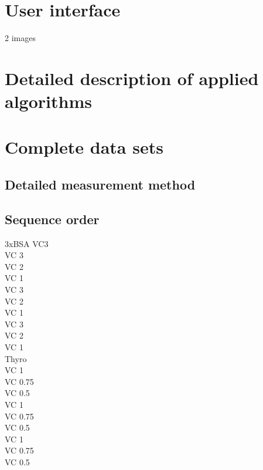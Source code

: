 \section*{User interface}

2 images 
\clearpage
\section*{Detailed description of applied algorithms}


    
\section*{Complete data sets}
\subsection*{Detailed measurement method}
\subsection*{Sequence order}
3xBSA VC3\\
VC 3\\
VC 2\\
VC 1\\
VC 3\\
VC 2\\
VC 1\\
VC 3\\
VC 2\\
VC 1\\
Thyro\\
VC 1\\
VC 0.75\\
VC 0.5\\
VC 1\\
VC 0.75\\
VC 0.5\\
VC 1\\
VC 0.75\\
VC 0.5\\
\printbibliography


